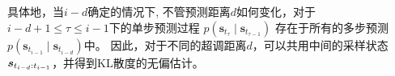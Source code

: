 具体地，当$i-d$确定的情况下, 不管预测距离$d$如何变化，对于$i-d + 1 \leq \tau \leq i-1$下的单步预测过程 $p\left(\boldsymbol{s}_{t_\tau} \mid \boldsymbol{s}_{t_{\tau-1}}\right)$ 存在于所有的多步预测 $p\left(\boldsymbol{s}_{t_{i-1}} \mid \boldsymbol{s}_{t_{i-d}}\right)$中。
因此，对于不同的超调距离$d$，可以共用中间的采样状态$\boldsymbol{s}_{t_{i-d}:t_{i-1}}$，并得到KL散度的无偏估计。


